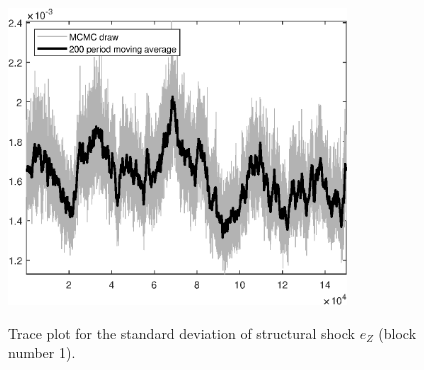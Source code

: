\begin{figure}[H]
\centering
  \includegraphics[width=0.8\textwidth]{BRS_imp_mobility/graphs/TracePlot_SE_e_Z_blck_1}\\
    \caption{Trace plot for the standard deviation of structural shock ${e_Z}$ (block number 1).}
\end{figure}
